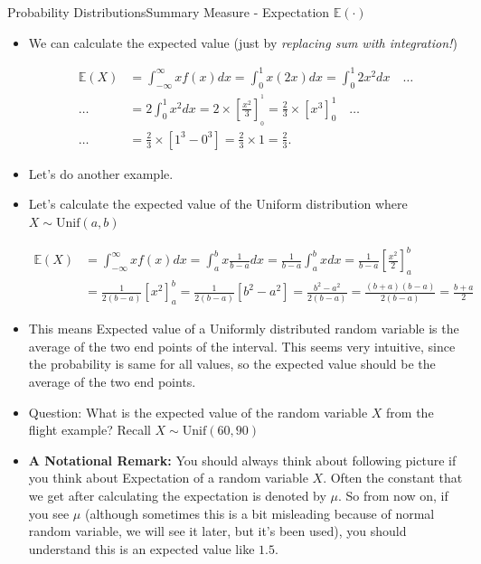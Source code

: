 \documentclass[8pt, usepdftitle=false]{beamer}
\begin{document}
\begin{frame}[allowframebreaks]{Probability Distributions}{Summary Measure - Expectation $\mathbb{E}(\cdot)$}
\begin{itemize}
\item We can calculate the expected value (just by \emph{replacing sum with integration!})

\begin{align*}
\mathbb{E}(X) &= \int_{-\infty}^{\infty} x f(x) d x = \int_{0}^{1} x (2x) dx = \int_{0}^{1} 2x^2 dx \quad \ldots \\	
\ldots &= 2 \int_{0}^{1} x^2 dx = 2 \times \left[\frac{x^2}{3}\right]^{^1}_{_{0}} = \frac{2}{3} \times \left[x^3\right]_{0}^{1}  \quad \ldots \\
\ldots &= \frac{2}{3} \times \left[{1^3} - {0^3}\right] = \frac{2}{3} \times 1 = \frac{2}{3} .
\end{align*}


\framebreak

\item Let's do another example. 

\item Let's calculate the expected value of the Uniform distribution where $X \sim \mathrm{Unif}(a, b)$

\begin{align*}
	\mathbb{E}(X) &= \int_{-\infty}^{\infty} x f(x) d x = \int_{a}^{b} x \frac{1}{b-a} dx = \frac{1}{b-a} \int_{a}^{b} x dx = \frac{1}{b-a} \left[\frac{x^2}{2}\right]_{a}^{b} \\
	&= \frac{1}{2(b-a)} \left[x^2\right]_{a}^{b} = \frac{1}{2(b-a)} \left[b^2 - a^2\right]  = \frac{b^2 - a^2}{2(b-a)} = \frac{(b+a)(b-a)}{2(b-a)} = \frac{b+a}{2}
\end{align*}


\item This means Expected value of a Uniformly distributed random variable is the average of the two end points of the interval. This seems very intuitive, since the probability is same for all values, so the expected value should be the average of the two end points. 

\item Question: What is the expected value of the random variable $X$ from the flight example? Recall $X \sim \mathrm{Unif}(60, 90)$



\item \textbf{\color{red}A Notational Remark:}  You should always think about following picture if you think about Expectation of a random variable $X$. Often the constant that we get after calculating the expectation is denoted by $\mu$. So from now on, if you see $\mu$ (although sometimes this is a bit misleading because of normal random variable, we will see it later, but it's been used), you should understand this is an expected value like $1.5$.


\end{itemize}
\end{frame}
\end{document}
